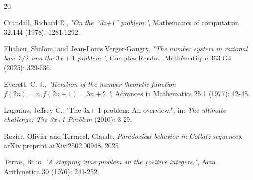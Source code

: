 \begin{thebibliography}{20}

 {\sc Crandall, Richard E.}, \emph{"On the “3x+1” problem."}, Mathematics of
computation 32.144 (1978): 1281-1292.

 {\sc Eliahou, Shalom, and Jean-Louis Verger-Gaugry},
 \emph{"The number system in rational base $3/2$ and the $3x+ 1$ problem."},
 Comptes Rendus. Mathématique 363.G4 (2025): 329-336.

 {\sc Everett, C. J.}, \emph{"Iteration of the number-theoretic function
$f(2n)= n, f(2n+1)= 3n+2$."}, Advances in Mathematics 25.1 (1977): 42-45.

 {\sc Lagarias, Jeffrey C.}, "The 3x+ 1 problem: An overview.", in: \emph{The
ultimate challenge: The 3x+1 Problem} (2010): 3-29.

 {\sc Rozier, Olivier and Terracol, Claude}, \emph{Paradoxical
behavior in Collatz sequences}, arXiv preprint arXiv:2502.00948, 2025

 {\sc Terras, Riho}, \emph{"A stopping time problem on the positive integers."},
  Acta Arithmetica 30 (1976): 241-252.

\end{thebibliography}
